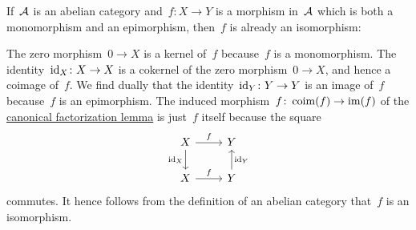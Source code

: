 \begin{remark*}
  If~$\mathcal{A}$ is an abelian category and~$f \colon X \to Y$ is a morphism in~$\mathcal{A}$ which is both a monomorphism and an epimorphism, then~$f$ is already an isomorphism:
  
  The zero morphism~$0 \to X$ is a kernel of~$f$ because~$f$ is a monomorphism.
  The identity~$\operatorname{id}_X \colon X \to X$ is a cokernel of the zero morphism~$0 \to X$, and hence a coimage of~$f$.
  We find dually that the identity~$\operatorname{id}_Y \colon Y \to Y$ is an image of~$f$ because~$f$ is an epimorphism.
  The induced morphism~$f \colon \operatorname{coim}(f) \to \operatorname{im}(f)$ of the \hyperref[canonical factorization]{canonical factorization lemma} is just~$f$ itself because the square
  \[
    \begin{tikzcd}
        X
        \arrow{r}[above]{f}
        \arrow{d}[left]{\id_X}
      & Y
      \\
        X 
        \arrow{r}[above]{f}
      & Y
        \arrow{u}[right]{\id_Y}
    \end{tikzcd}
  \]
  commutes.
  It hence follows from the definition of an abelian category that~$f$ is an isomorphism.
\end{remark*}


